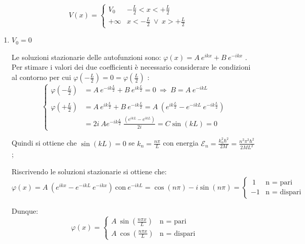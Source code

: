 \documentclass[12pt,twoside,a4]{article}
\begin{document}
\begin{solution}
\begin{equation*}
   V(x) = \begin{cases}
    V_0  & -\frac{L}{2} < x < + \frac{L}{2} \\
    + \infty  & x < - \frac{L}{2} \ \lor \ x > + \frac{L}{2}
    \end{cases}
\end{equation*}

\begin{enumerate}[label=(\textit{\roman*})]
\item
$V_0 = 0$

Le soluzioni stazionarie delle autofunzioni sono: $\varphi(x) = A \ e^{ikx} + B \ e^{-ikx}$ . Per stimare i valori dei due coefficienti è necessario considerare le condizioni al contorno per cui $\varphi(-\frac{L}{2}) = 0 = \varphi(\frac{L}{2})$ : 
\begin{equation*}
\begin{cases}
    \varphi \left(- \frac{L}{2} \right) 
    &= A \ e^{-ik\frac{L}{2}} + B \ e^{ik\frac{L}{2}} = 0  \  \Rightarrow  \  B = A \ e^{-ikL}  \\
    \\

    \varphi \left(+ \frac{L}{2} \right) 
    & = A \ e^{ik\frac{L}{2}} + B \ e^{-ik\frac{L}{2}} = A \ \left(e^{ik\frac{L}{2}} - e^{-ikL} \ e^{-ik\frac{L}{2}} \right)  \\
    & =  2i \ A e^{-ik\frac{L}{2}} \ \frac{(e^{ikL} - e^{ikL})}{2i} = C \sin{(kL)} = 0
    \end{cases}
\end{equation*}

Quindi si ottiene che $\sin{(kL)} = 0$ se $k_n = \frac{n \pi}{L}$ con energia $\mathcal{E}_n = \frac{k_n^2 \hbar^2}{2 M} = \frac{n^2 \pi^2 \hbar^2}{ 2 M L^2}$ ;

Riscrivendo le soluzioni stazionarie si ottiene che: 
\begin{equation*}
\varphi(x) = A \ \left(e^{ikx} - e^{-ikL} \ e^{-ikx} \right)   \  \text{con}  \  e^{-ikL} = \cos{(n \pi)} - i \sin{(n \pi)} = \begin{cases}
    \ 1  &  \text{n = pari} \\
    -1  &  \text{n = dispari}
\end{cases}
\end{equation*}

Dunque: 
\begin{equation*}
\varphi(x) = \begin{cases}
    A \ \sin{\left(\frac{n \pi x }{L}\right)}  &  \text{n = pari} \\[1em]
    A \ \cos{\left(\frac{n \pi x }{L}\right)}  &  \text{n = dispari}
\end{cases}
\end{equation*}


\end{enumerate}
\end{solution}
\end{document}
